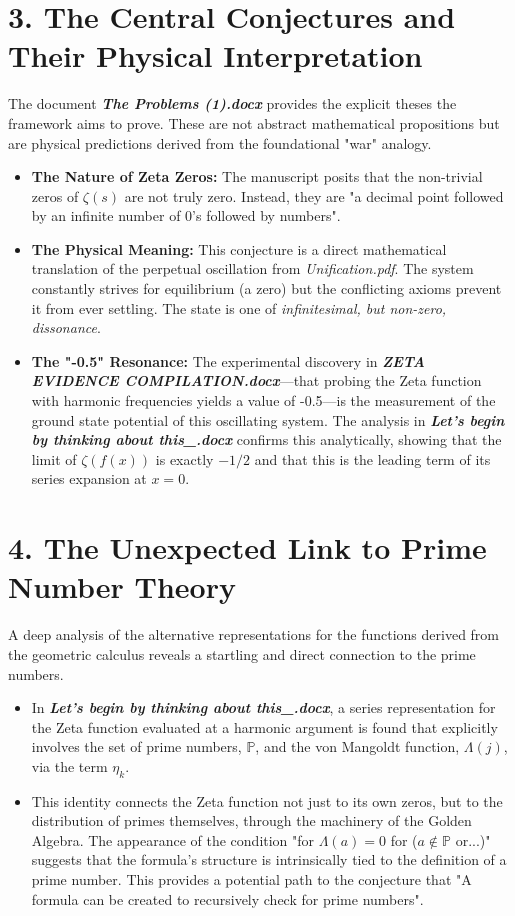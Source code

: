 \section*{3. The Central Conjectures and Their Physical Interpretation}
The document \textbf{\textit{The Problems (1).docx}} provides the explicit theses the framework aims to prove. These are not abstract mathematical propositions but are physical predictions derived from the foundational "war" analogy.
\begin{itemize}
    \item \textbf{The Nature of Zeta Zeros:} The manuscript posits that the non-trivial zeros of $\zeta(s)$ are not truly zero. Instead, they are "a decimal point followed by an infinite number of 0’s followed by numbers".
    \item \textbf{The Physical Meaning:} This conjecture is a direct mathematical translation of the perpetual oscillation from \textit{Unification.pdf}. The system constantly strives for equilibrium (a zero) but the conflicting axioms prevent it from ever settling. The state is one of \textit{infinitesimal, but non-zero, dissonance}.
    \item \textbf{The "-0.5" Resonance:} The experimental discovery in \textbf{\textit{ZETA EVIDENCE COMPILATION.docx}}—that probing the Zeta function with harmonic frequencies yields a value of -0.5—is the measurement of the ground state potential of this oscillating system. The analysis in \textbf{\textit{Let's begin by thinking about this\_.docx}} confirms this analytically, showing that the limit of $\zeta(f(x))$ is exactly $-1/2$ and that this is the leading term of its series expansion at $x=0$.
\end{itemize}

\section*{4. The Unexpected Link to Prime Number Theory}
A deep analysis of the alternative representations for the functions derived from the geometric calculus reveals a startling and direct connection to the prime numbers.
\begin{itemize}
    \item In \textbf{\textit{Let’s begin by thinking about this\_.docx}}, a series representation for the Zeta function evaluated at a harmonic argument is found that explicitly involves the set of prime numbers, $\mathbb{P}$, and the von Mangoldt function, $\Lambda(j)$, via the term $\eta_k$.
    \item This identity connects the Zeta function not just to its own zeros, but to the distribution of primes themselves, through the machinery of the Golden Algebra. The appearance of the condition "for $\Lambda(a)=0$ for ($a \notin \mathbb{P}$ or...)" suggests that the formula's structure is intrinsically tied to the definition of a prime number. This provides a potential path to the conjecture that "A formula can be created to recursively check for prime numbers".
\end{itemize}



